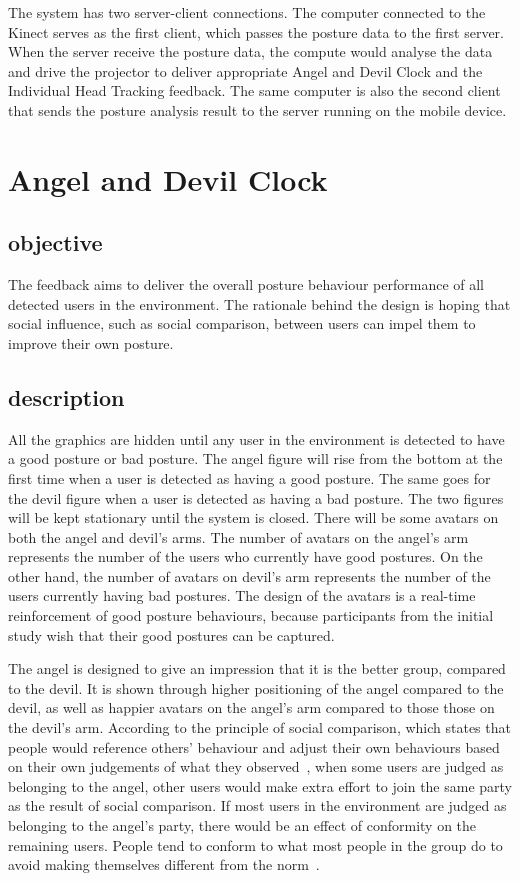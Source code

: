 The system has two server-client connections. The computer connected to the Kinect serves as the first client, which passes the posture data to the first server. When the server receive the posture data, the compute would analyse the data and drive the projector to deliver appropriate Angel and Devil Clock and the Individual Head Tracking feedback. The same computer is also the second client that sends the posture analysis result to the server running on the mobile device.

\section{Angel and Devil Clock}

\subsection{objective}
The feedback aims to deliver the overall posture behaviour performance of all detected users in the environment. The rationale behind the design is hoping that social influence, such as social comparison, between users can impel them to improve their own posture.

\subsection{description}
All the graphics are hidden until any user in the environment is detected to have a good posture or bad posture. The angel figure will rise from the bottom at the first time when a user is detected as having a good posture. The same goes for the devil figure when a user is detected as having a bad posture. The two figures will be kept stationary until the system is closed. There will be some avatars on both the angel and devil’s arms. The number of avatars on the angel’s arm represents the number of the users who currently have good postures. On the other hand, the number of avatars on devil’s arm represents the number of the users currently having bad postures. The design of the avatars is a real-time reinforcement of good posture behaviours, because participants from the initial study wish that their good postures can be captured.

The angel is designed to give an impression that it is the better group, compared to the devil. It is shown through higher positioning of the angel compared to the devil, as well as happier avatars on the angel's arm compared to those those on the devil’s arm. According to the principle of social comparison, which states that people would reference others' behaviour and adjust their own behaviours based on their own judgements of what they observed~\cite{social_identity_comparison}, when some users are judged as belonging to the angel, other users would make extra effort to join the same party as the result of social comparison. If most users in the environment are judged as belonging to the angel’s party, there would be an effect of conformity on the remaining users. People tend to conform to what most people in the group do to avoid making themselves different from the norm~\cite{social_influence_complicance_conformity}.

